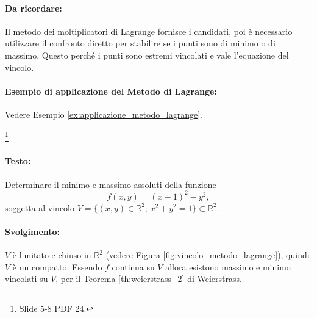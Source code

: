 \paragraph{Da ricordare:} Il metodo dei moltiplicatori di Lagrange fornisce i candidati, poi è necessario utilizzare il confronto diretto per stabilire se i punti sono di minimo o di massimo. Questo perché i punti sono estremi vincolati e vale l'equazione del vincolo.

\paragraph{Esempio di applicazione del Metodo di Lagrange:} Vedere Esempio \ref{ex:applicazione_metodo_lagrange}.

\begin{example}
	\footnote{Slide 5-8 PDF 24.}
	\paragraph{Testo:} Determinare il minimo e massimo assoluti della funzione
	\begin{equation*}
		f(x,y) = (x-1)^2 - y^2,
	\end{equation*}
	soggetta al vincolo $V=\{(x,y)\in\mathbb{R}^2;\, x^2+y^2 = 1\}\subset\mathbb{R}^2$.
	\paragraph{Svolgimento:} $V$ è limitato e chiuso in $\mathbb{R}^2$ (vedere Figura \ref{fig:vincolo_metodo_lagrange}), quindi $V$ è un compatto. Essendo $f$ continua su $V$ allora esistono massimo e minimo vincolati su $V$, per il Teorema \ref{th:weierstrass_2} di Weierstrass.\\
	\begin{figure}[ht]
		\centering
\end{figure}
\end{example}
